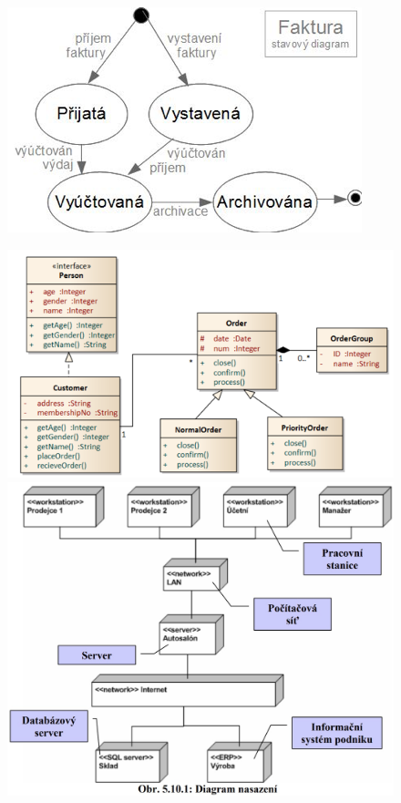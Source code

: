 \begin{figure}[H]
	\centering
	\includegraphics[width=.4\textwidth]{assets/diag_stavovy.png}
\end{figure}
\begin{figure}
	\centering
	\begin{minipage}{.5\textwidth}
		\centering
		\includegraphics[width=.95\linewidth]{assets/diag_tridni.png}
	\end{minipage}%
	\begin{minipage}{.5\textwidth}
		\centering
		\includegraphics[width=.95\linewidth]{assets/diagram_nasazeni.jpg}
	\end{minipage}
\end{figure}


